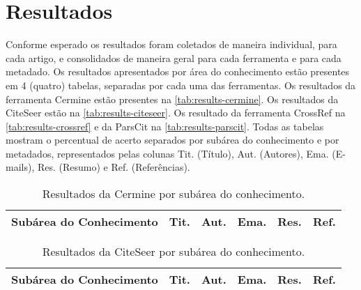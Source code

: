 
\section{Resultados}
\label{sec:results}


Conforme esperado os resultados foram coletados de maneira individual, para cada artigo, e consolidados de maneira geral para cada ferramenta e para cada metadado. Os resultados apresentados por área do conhecimento estão presentes em 4 (quatro) tabelas, separadas por cada uma das ferramentas. Os resultados da ferramenta Cermine estão presentes na \autoref{tab:results-cermine}. Os resultados da CiteSeer estão na \autoref{tab:results-citeseer}. Os resultado da ferramenta CrossRef na \autoref{tab:results-crossref} e da ParsCit na \autoref{tab:results-parscit}. Todas as tabelas mostram o percentual de acerto separados por subárea do conhecimento e por metadados, representados pelas colunas Tit. (Título),  Aut. (Autores), Ema. (E-mails), Res. (Resumo) e Ref. (Referências).

\begin{table}
    \caption{Resultados da Cermine por subárea do conhecimento.}
    \begin{center}
        \begin{tabular}{|p{6cm}|C{1.2cm}|C{1.2cm}|C{1.2cm}|C{1.2cm}|C{1.2cm}|}
            \hline 
            \textbf{Subárea do Conhecimento} & \textbf{Tit.} & \textbf{Aut.} & \textbf{Ema.} & \textbf{Res.} & \textbf{Ref.} \\ \hline 
            
        \end{tabular}
    \end{center}
    \label{tab:results-cermine}
\end{table}

\begin{table}
    \caption{Resultados da CiteSeer por subárea do conhecimento.}
    \begin{center}
        \begin{tabular}{|p{6cm}|C{1.2cm}|C{1.2cm}|C{1.2cm}|C{1.2cm}|C{1.2cm}|}
            \hline 
            \textbf{Subárea do Conhecimento} & \textbf{Tit.} & \textbf{Aut.} & \textbf{Ema.} & \textbf{Res.} & \textbf{Ref.} \\ \hline 
            
        \end{tabular}
    \end{center}
    \label{tab:results-citeseer}
\end{table}

